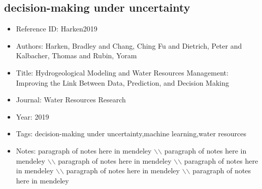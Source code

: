 \documentclass[11pt]{article}
\begin{document}
\subsection{decision-making under uncertainty} 
\noindent\citep{Harken2019} 
\begin{itemize} 
\item{Reference ID:  Harken2019} 

\item{Authors:  Harken, Bradley and Chang, Ching Fu and Dietrich, Peter and Kalbacher, Thomas and Rubin, Yoram} 

\item{Title:  Hydrogeological Modeling and Water Resources Management: Improving the Link Between Data, Prediction, and Decision Making} 

\item{Journal:  Water Resources Research} 

\item{Year:  2019} 

\item{Tags:  decision-making under uncertainty,machine learning,water resources} 

\item{Notes:  paragraph of notes here in mendeley $\backslash$$\backslash$ paragraph of notes here in mendeley $\backslash$$\backslash$ paragraph of notes here in mendeley $\backslash$$\backslash$ paragraph of notes here in mendeley $\backslash$$\backslash$ paragraph of notes here in mendeley $\backslash$$\backslash$ paragraph of notes here in mendeley} 

\end{itemize}\medskip
\end{document}
